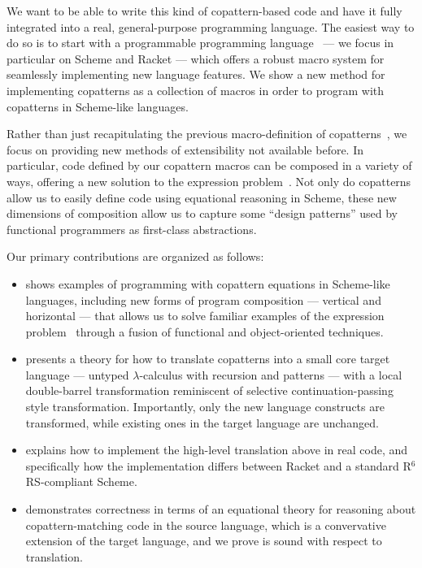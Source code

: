 We want to be able to write this kind of copattern-based code and have it fully integrated into a real, general-purpose programming language.
The easiest way to do so is to start with a programmable programming language~\cite{ProgrammablePL} --- we focus in particular on Scheme and Racket --- which offers a robust macro system for seamlessly implementing new language features.
We show a new method for implementing copatterns as a collection of macros in order to program with copatterns in Scheme-like languages.

Rather than just recapitulating the previous macro-definition of copatterns~\cite{LaforgueR17}, we focus on providing new methods of extensibility not available before.
In particular, code defined by our copattern macros can be composed in a variety of ways,
offering a new solution to the expression problem~\cite{ExpressionProblem}.
Not only do copatterns allow us to easily define code using equational reasoning in Scheme, these new dimensions of composition allow us to capture some ``design patterns'' used by functional programmers as first-class abstractions.

Our primary contributions are organized as follows:
\begin{itemize}
\item {} shows examples of programming with copattern equations in Scheme-like languages, including new forms of program composition --- vertical and horizontal --- that allows us to solve familiar examples of the expression problem~\cite{ExpressionProblem} through a fusion of functional and object-oriented techniques.
\item {} presents a theory for how to translate copatterns into a small core target language --- untyped $\lambda$-calculus with recursion and patterns --- with a local double-barrel transformation reminiscent of selective continuation-passing style transformation.
  Importantly, only the new language constructs are transformed, while existing ones in the target language are unchanged.
\item {} explains how to implement the high-level translation above in real code, and specifically how the implementation differs between Racket and a standard R${}^6$RS-compliant Scheme.
\item {} demonstrates correctness in terms of an equational theory for reasoning about copattern-matching code in the source language, which is a convervative extension of the target language, and we prove is sound with respect to translation.
\end{itemize} 


